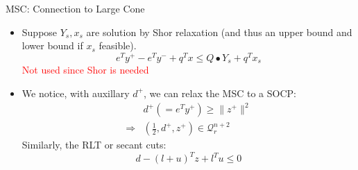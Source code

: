 \begin{frame}{MSC: Connection to Large Cone}
  \begin{itemize}
    \item Suppose \(Y_s, x_s\) are solution by Shor relaxation (and thus an upper bound and lower bound if \(x_s\) feasible).
          \[e^Ty^+ - e^Ty^- +  q^Tx \le Q\bullet Y_s  + q^T x_s\]
          \textcolor{red}{Not used since Shor is needed}
    \item We notice, with auxillary \(d^+\), we can relax the MSC to a SOCP:
          \[\begin{aligned}
                          & d^+ (= e^Ty^+) \ge \|z^+\|^2                    \\
              \Rightarrow & (\frac{1}{2}, d^+, z^+) \in \mathcal{Q}^{n+2}_r
            \end{aligned}
          \]
          Similarly, the RLT or secant cuts:
          \[
            d - (l + u)^Tz + l^Tu \le 0
          \]
  \end{itemize}

\end{frame}






